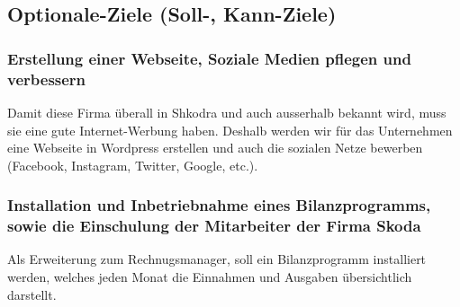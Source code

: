 \subsection{Optionale-Ziele (Soll-, Kann-Ziele)}

\subsubsection{Erstellung einer Webseite, Soziale Medien pflegen und verbessern}
Damit diese Firma \"uberall in Shkodra und auch ausserhalb bekannt wird, muss sie eine gute Internet-Werbung haben. Deshalb werden wir f\"ur das Unternehmen eine Webseite in Wordpress erstellen und auch die sozialen Netze bewerben (Facebook, Instagram, Twitter, Google, etc.).

\subsubsection{Installation und Inbetriebnahme eines Bilanzprogramms, sowie die Einschulung der Mitarbeiter der Firma Skoda}
Als Erweiterung zum Rechnugsmanager, soll ein Bilanzprogramm installiert werden, welches jeden Monat die Einnahmen und Ausgaben \"ubersichtlich darstellt.


